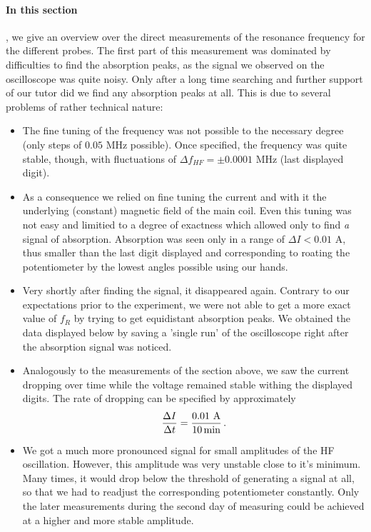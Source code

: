 \paragraph{In this section}, 
we give an overview over the direct measurements of the resonance frequency
for the different probes. The first part of this measurement was dominated by difficulties 
to find the absorption peaks, as the signal we observed on the oscilloscope was quite noisy. 
Only after a long time searching and further support of our tutor did we find any absorption 
peaks at all. This is due to several problems of rather technical nature:
\begin{itemize}
    \item
        The fine tuning of the frequency was not possible to the necessary degree (only
        steps of $0.05$ MHz possible). Once specified, the frequency was quite stable, though, 
        with fluctuations of $\Delta f_{HF} = \pm 0.0001$ MHz (last displayed digit).
    \item
        As a consequence we relied on fine tuning the 
        current and with it the underlying (constant) magnetic field of the main coil. 
        Even this tuning was not easy and limitied to a degree of exactness which 
        allowed only to find \emph{a} signal of absorption. Absorption was seen only in 
        a range of $\Delta I < 0.01$ A, thus smaller than the last digit displayed and 
        corresponding to roating the potentiometer by the lowest angles possible using our hands. 
    \item
        Very shortly after finding the signal, it disappeared again.
        Contrary to our expectations prior to the experiment, 
        we were not able to get a more exact 
        value of $f_R$ by trying to get equidistant absorption peaks. 
        We obtained the data displayed below by saving a 'single run' of the 
        oscilloscope right after the absorption signal was noticed. 
    \item 
        Analogously to the measurements of the section above, we saw the current dropping 
        over time while the voltage remained stable withing the displayed digits. 
        The rate of dropping can be specified by approximately 
        \begin{equation}
            \frac{\Delta I }{\Delta t} = \frac{0.01 \, \, \mathrm{A}}{10 \, \mathrm{min}} \, .
        \end{equation}
    \item
        We got a much more pronounced signal for small amplitudes of the HF oscillation. 
        However, this amplitude was very unstable close to it's minimum. Many times, it would 
        drop below the threshold of generating a signal at all, so that we had to readjust the 
        corresponding potentiometer constantly. Only the later measurements during the second day 
        of measuring could be achieved at a higher and more stable amplitude. 
\end{itemize}
